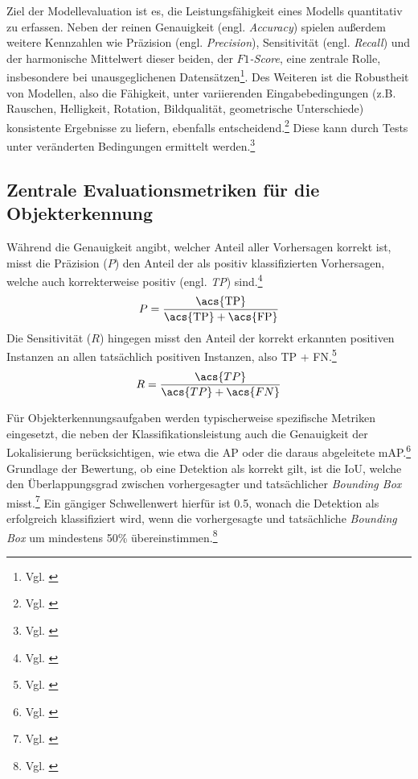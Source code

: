 Ziel der Modellevaluation ist es, die Leistungsfähigkeit eines Modells quantitativ zu erfassen. Neben der reinen Genauigkeit (engl. \textit{Accuracy}) spielen außerdem weitere Kennzahlen wie Präzision (engl. \textit{Precision}), Sensitivität (engl. \textit{Recall}) und der harmonische Mittelwert dieser beiden, der \textit{\(F1\)-Score}, eine zentrale Rolle, insbesondere bei unausgeglichenen Datensätzen\footnote{Vgl. \cite[S. 65240]{arslanoglu_vision_2025}}. Des Weiteren ist die Robustheit von Modellen, also die Fähigkeit, unter variierenden Eingabebedingungen (z.B. Rauschen, Helligkeit, Rotation, Bildqualität, geometrische Unterschiede) konsistente Ergebnisse zu liefern, ebenfalls entscheidend.\footnote{Vgl. \cite[S. 65234]{arslanoglu_vision_2025}} Diese kann durch Tests unter veränderten Bedingungen ermittelt werden.\footnote{Vgl. \cite[S. 323]{zhang_computer_2023}}

\subsection{Zentrale Evaluationsmetriken für die Objekterkennung}

Während die Genauigkeit angibt, welcher Anteil aller Vorhersagen korrekt ist, misst die Präzision (\(P\)) den Anteil der als positiv klassifizierten Vorhersagen, welche auch korrekterweise positiv (engl. \textit{\ac{TP}}) sind.\footnote{Vgl. \cite[S. 65240]{arslanoglu_vision_2025}}
\[
P = \frac{\text{\acs{TP}}}{\text{\acs{TP}} + \text{\acs{FP}}}
\]
Die Sensitivität (\(R\)) hingegen misst den Anteil der korrekt erkannten positiven Instanzen an allen tatsächlich positiven Instanzen, also \acf{TP} + \ac{FN}.\footnote{Vgl. \cite[S. 65240]{arslanoglu_vision_2025}} 
\[
R = \frac{\acs{TP}}{\acs{TP} + \acs{FN}}
\]

Für Objekterkennungsaufgaben werden typischerweise spezifische Metriken eingesetzt, die neben der Klassifikationsleistung auch die Genauigkeit der Lokalisierung berücksichtigen, wie etwa die \ac{AP} oder die daraus abgeleitete \ac{mAP}.\footnote{Vgl. \cite[S. 94272]{khanam_comprehensive_2024}} Grundlage der Bewertung, ob eine Detektion als korrekt gilt, ist die \ac{IoU}, welche den Überlappungsgrad zwischen vorhergesagter und tatsächlicher \textit{Bounding Box} misst.\footnote{Vgl. \cite[S. 94272]{khanam_comprehensive_2024}} Ein gängiger Schwellenwert hierfür ist 0.5, wonach die Detektion als erfolgreich klassifiziert wird, wenn die vorhergesagte und tatsächliche \textit{Bounding Box} um mindestens 50\% übereinstimmen.\footnote{Vgl. \cite[S. 94272]{khanam_comprehensive_2024}}

